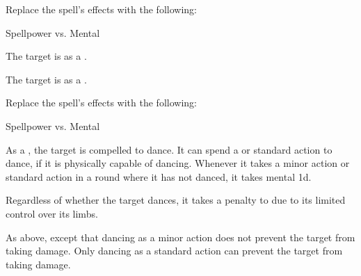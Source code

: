 


Replace the spell's effects with the following:
\begin{spellcontent}

\begin{augmenteffects}




\begin{spellattack}{Spellpower vs. Mental}


\hit The target is \disoriented as a .


\crit The target is \confused as a .


\end{spellattack}





\end{augmenteffects}

\end{spellcontent}








Replace the spell's effects with the following:
\begin{spellcontent}

\begin{augmenteffects}




\begin{spellattack}{Spellpower vs. Mental}


\hit
As a , the target is compelled to dance.
It can spend a  or standard action to dance, if it is physically capable of dancing.
Whenever it takes a minor action or standard action in a round where it has not danced, it takes mental  \plus1d.

Regardless of whether the target dances, it takes a  penalty to  due to its limited control over its limbs.



\crit
As above, except that dancing as a minor action does not prevent the target from taking damage.
Only dancing as a standard action can prevent the target from taking damage.



\end{spellattack}





\end{augmenteffects}

\end{spellcontent}





